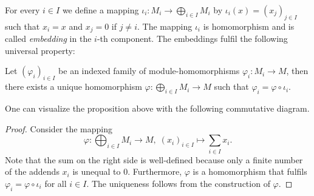 For every $i\in I$ we define a mapping $\iota_i\colon M_i\to \bigoplus_{i\in I}M_i$ by $\iota_i(x)=(x_j)_{j\in I}$ such that $x_i=x$ and $x_j=0$ if $j\neq i$. The mapping $\iota_i$ is homomorphism and is called \textit{embedding} in the $i$-th component. The embeddings fulfil the following universal property:

\begin{pro}\label{prop.UniversalPropertyDirectSum}
Let $(\varphi_i)_{i\in I}$ be an indexed family of module-homomorphisms $\varphi_i\colon M_i\to M$, then there exists a unique homomorphism $\varphi\colon\bigoplus_{i\in I}M_i\to M$ such that $\varphi_i=\varphi\circ\iota_i$.
\end{pro}

One can visualize the proposition above with the following commutative diagram.
\begin{center}
\end{center}


\begin{proof}
Consider the mapping 
\[\varphi\colon\bigoplus_{i\in I}M_i\to M, \; (x_i)_{i\in I}\mapsto\sum_{i\in I}x_i.\]
Note that the sum on the right side is well-defined because only a finite number of the addends $x_i$ is unequal to 0. Furthermore, $\varphi$ is a homomorphism that fulfils $\varphi_i=\varphi\circ\iota_i$ for all $i\in I$. The uniqueness follows from the construction of $\varphi$.
\end{proof}

%
